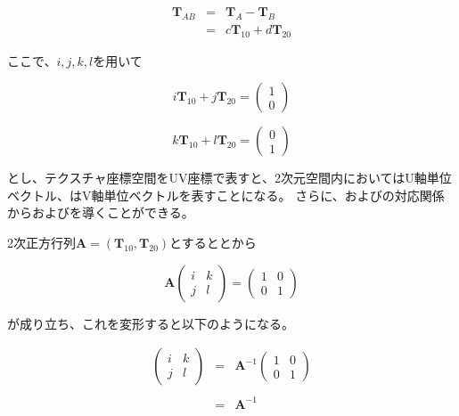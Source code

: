 \begin{eqnarray}
\bm{T}_{AB} &=& \bm{T}_A - \bm{T}_B\nonumber\\
           &=& c\bm{T}_{10} +  d\bm{T}_{20}  
\label{ETab}
\end{eqnarray}

ここで、$i,j,k,l$を用いて

\begin{equation}
i\bm{T}_{10} + j\bm{T}_{20} = 
\begin{pmatrix}
1\\
0
\end{pmatrix}
\label{EUnit2u}
\end{equation}

\begin{equation}
k\bm{T}_{10} + l\bm{T}_{20} = 
\begin{pmatrix}
0\\
1
\end{pmatrix}
\label{EUnit2v}
\end{equation}

\noindent
とし、テクスチャ座標空間をUV座標で表すと、2次元空間内においてはU軸単位ベクトル、はV軸単位ベクトルを表すことになる。
さらに、およびの対応関係からおよびを導くことができる。

2次正方行列$\bm{A} = (\bm{T}_{10}, \bm{T}_{20})$とするととから

\begin{equation}
\bm{A} 
\begin{pmatrix}
i &k\\
j &l
\end{pmatrix}
=
\begin{pmatrix}
1 &0\\
0 &1
\end{pmatrix}
\label{EAx=I}
\end{equation}

\noindent
{}が成り立ち、これを変形すると以下のようになる。

\begin{eqnarray}
\label{EIjkl}
\begin{pmatrix}
i &k\\
j &l
\end{pmatrix}
&=& \bm{A}^{-1}
\begin{pmatrix}
1 &0\\
0 &1
\end{pmatrix}\nonumber\\
\nonumber\\
&=& \bm{A}^{-1}
\end{eqnarray}

